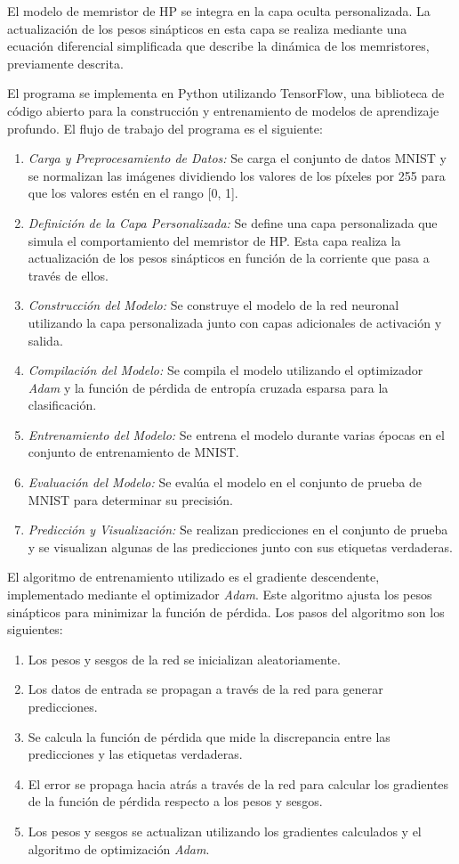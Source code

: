 \documentclass[conference]{IEEEtran}
\begin{document}
El modelo de memristor de HP se integra en la capa oculta personalizada. La actualización de los pesos sinápticos en esta capa se realiza mediante una ecuación diferencial simplificada que describe la dinámica de los memristores, previamente descrita.

El programa se implementa en Python utilizando TensorFlow, una biblioteca de código abierto para la construcción y entrenamiento de modelos de aprendizaje profundo. El flujo de trabajo del programa es el siguiente:

\begin{enumerate}
	\item \textit{Carga y Preprocesamiento de Datos:} Se carga el conjunto de datos MNIST y se normalizan las imágenes dividiendo los valores de los píxeles por 255 para que los valores estén en el rango [0, 1].
	\item \textit{Definición de la Capa Personalizada:} Se define una capa personalizada que simula el comportamiento del memristor de HP. Esta capa realiza la actualización de los pesos sinápticos en función de la corriente que pasa a través de ellos.
	\item \textit{Construcción del Modelo:} Se construye el modelo de la red neuronal utilizando la capa personalizada junto con capas adicionales de activación y salida.
	\item \textit{Compilación del Modelo:} Se compila el modelo utilizando el optimizador \textit{Adam} y la función de pérdida de entropía cruzada esparsa para la clasificación.
	\item \textit{Entrenamiento del Modelo:} Se entrena el modelo durante varias épocas en el conjunto de entrenamiento de MNIST.
	\item \textit{Evaluación del Modelo:} Se evalúa el modelo en el conjunto de prueba de MNIST para determinar su precisión.
	\item \textit{Predicción y Visualización:} Se realizan predicciones en el conjunto de prueba y se visualizan algunas de las predicciones junto con sus etiquetas verdaderas.
\end{enumerate}

El algoritmo de entrenamiento utilizado es el gradiente descendente, implementado mediante el optimizador \textit{Adam}. Este algoritmo ajusta los pesos sinápticos para minimizar la función de pérdida. Los pasos del algoritmo son los siguientes:

\begin{enumerate}
	\item Los pesos y sesgos de la red se inicializan aleatoriamente.
	\item Los datos de entrada se propagan a través de la red para generar predicciones.
	\item Se calcula la función de pérdida que mide la discrepancia entre las predicciones y las etiquetas verdaderas.
	\item El error se propaga hacia atrás a través de la red para calcular los gradientes de la función de pérdida respecto a los pesos y sesgos.
	\item Los pesos y sesgos se actualizan utilizando los gradientes calculados y el algoritmo de optimización \textit{Adam}.
\end{enumerate}
\end{document}
